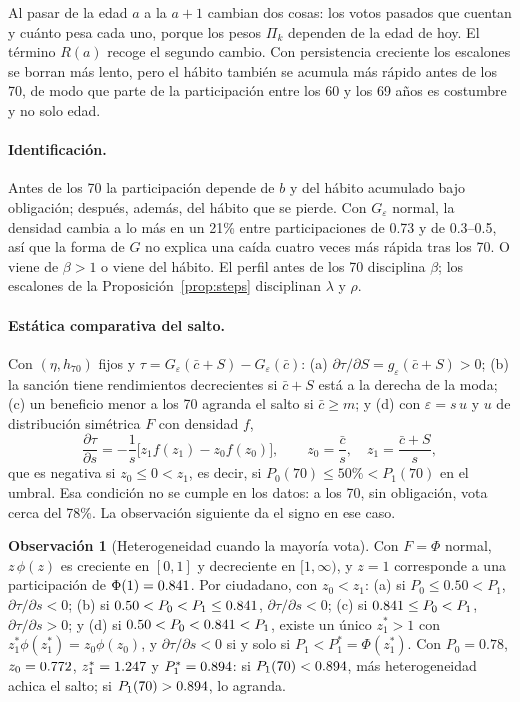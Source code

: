 \documentclass[11pt]{article}
\theoremstyle{definition}
\newtheorem{remark}{Observación}
\newcommand{\1}{\mathbbm{1}}
\begin{document}
Al pasar de la edad $a$ a la $a+1$ cambian dos cosas: los votos pasados que cuentan y cuánto pesa
cada uno, porque los pesos $\Pi_k$ dependen de la edad de hoy. El término $R(a)$ recoge el segundo
cambio. Con persistencia creciente los escalones se borran más lento, pero el hábito también se
acumula más rápido antes de los 70, de modo que parte de la participación entre los 60 y los 69 años
es costumbre y no solo edad.

\paragraph{Identificación.} Antes de los 70 la participación depende de $b$ y del hábito acumulado
bajo obligación; después, además, del hábito que se pierde. Con $G_\varepsilon$ normal, la densidad
cambia a lo más en un 21\% entre participaciones de 0.73 y de 0.3--0.5, así que la forma de $G$ no
explica una caída cuatro veces más rápida tras los 70. O viene de $\beta>1$ o viene del hábito. El
perfil antes de los 70 disciplina $\beta$; los escalones de la Proposición~\ref{prop:steps}
disciplinan $\lambda$ y $\rho$.

\paragraph{Estática comparativa del salto.} Con $(\eta,h_{70})$ fijos y
$\tau=G_\varepsilon(\bar c+S)-G_\varepsilon(\bar c)$: (a) $\partial\tau/\partial S=g_\varepsilon(\bar
c+S)>0$; (b) la sanción tiene rendimientos decrecientes si $\bar c+S$ está a la derecha de la moda;
(c) un beneficio menor a los 70 agranda el salto si $\bar c\ge m$; y (d) con $\varepsilon=s\,u$ y $u$
de distribución simétrica $F$ con densidad $f$,
\begin{equation}\label{eq:dtauds}
  \frac{\partial\tau}{\partial s}=-\frac1s\bigl[z_1f(z_1)-z_0f(z_0)\bigr],\qquad
  z_0=\frac{\bar c}{s},\quad z_1=\frac{\bar c+S}{s},
\end{equation}
que es negativa si $z_0\le0<z_1$, es decir, si $P_0(70)\le50\%<P_1(70)$ en el umbral. Esa condición
no se cumple en los datos: a los 70, sin obligación, vota cerca del 78\%. La observación siguiente da
el signo en ese caso.

\begin{remark}[Heterogeneidad cuando la mayoría vota]\label{rem:het}
Con $F=\Phi$ normal, $z\,\phi(z)$ es creciente en $[0,1]$ y decreciente en $[1,\infty)$, y $z=1$
corresponde a una participación de $\Phi(1)=0.841$. Por ciudadano, con $z_0<z_1$:
(a) si $P_0\le0.50<P_1$, $\partial\tau/\partial s<0$; (b) si $0.50<P_0<P_1\le0.841$,
$\partial\tau/\partial s<0$; (c) si $0.841\le P_0<P_1$, $\partial\tau/\partial s>0$; y (d) si
$0.50<P_0<0.841<P_1$, existe un único $z_1^*>1$ con $z_1^*\phi(z_1^*)=z_0\phi(z_0)$, y
$\partial\tau/\partial s<0$ si y solo si $P_1<P_1^*=\Phi(z_1^*)$. Con $P_0=0.78$, $z_0=0.772$,
$z_1^*=1.247$ y $P_1^*=0.894$: si $P_1(70)<0.894$, más heterogeneidad achica el salto; si
$P_1(70)>0.894$, lo agranda.
\end{remark}
\end{document}
